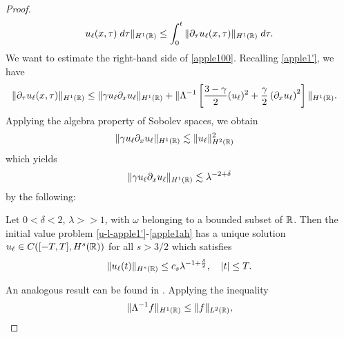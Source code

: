 \begin{proof}
\begin{equation}
\begin{split}
u_\ell(x,\tau) \; d \tau \|_{H^1(\mathbb{R})}
\le \int_0^t \|\partial_\tau u_\ell (x,\tau) \|_{H^1(\mathbb{R})} \; d \tau.
\label{apple100}
\end{split}
\end{equation}
%
%
We want to estimate the right-hand side of \eqref{apple100}. Recalling
\eqref{apple1'}, we have
%
%
\begin{equation}
\label{apple101}
\begin{split}
\|\partial_\tau u_\ell(x,\tau) \|_{H^1(\mathbb{R})}
& \le \|\gamma u_\ell \partial_x u_\ell \|_{H^1(\mathbb{R})}
+ \|\Lambda^{-1} \left[
\frac{3-\gamma}{2} (u_\ell)^2 + \frac{\gamma}{2} \left( \partial_x u_\ell 
\right)^2
\right] \|_{H^1(\mathbb{R})}.
\end{split}
\end{equation}
%
%
Applying the algebra property of Sobolev spaces, we obtain
%
%
\begin{equation*}
\begin{split}
\|\gamma u_\ell \partial_x u_\ell \|_{H^1(\mathbb{R})} &
\lesssim \|u_\ell\|_{H^2(\mathbb{R})}^2
\end{split}
\end{equation*}
%
%
which yields 
%
%
\begin{equation}
\begin{split}
\|\gamma u_\ell \partial_x u_\ell \|_{H^1(\mathbb{R})} \lesssim \lambda^{-2 + \delta}
\label{apple102}
\end{split}
\end{equation}
%
%
%
%
by the following:
%
%
%
%
%
% 				
%
%
%
%
%
\begin{lemma}
\label{appleb}
Let $0<\delta<2$, $\lambda >>1$, with $\omega$ belonging to a bounded
subset of $\mathbb{R}$. Then the initial value problem
\eqref{u-l-apple1'}-\eqref{apple1ah}
has a unique solution
$u_\ell \in C( [-T,T], H^s(\mathbb{R}))$ for all $s
> 3/2$ which satisfies
%
%
\begin{equation}
\label{apple10'}
\|u_\ell(t)\|_{H^s(\mathbb{R})} \le c_s \lambda^{-1 +
\frac{\delta}{2}}, \quad |t| \le T.
\end{equation}
%
%
\end{lemma}
%
An analogous result can be found in \cite{Himonas:2009fk}. 
%
%
%
Applying the inequality 
%
\begin{equation}
\begin{split}
\|\Lambda^{-1} f \|_{H^1(\mathbb{R})} \le \|f\|_{L^2(\mathbb{R})},
\label{apple27}
\end{split}
\end{equation}

\end{proof}
